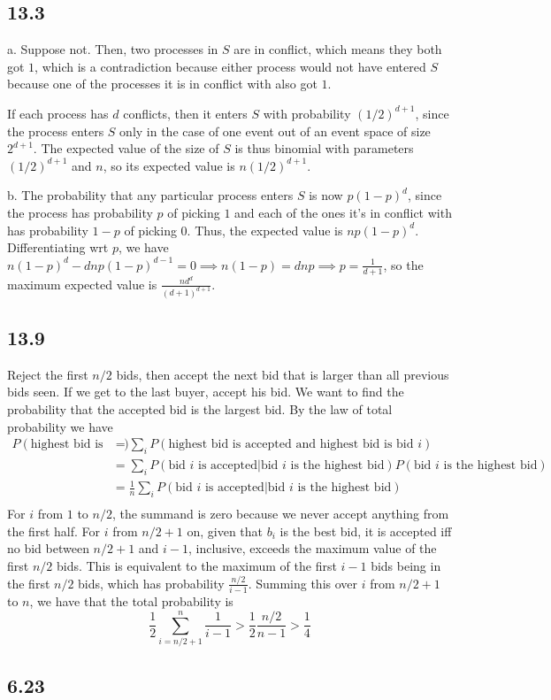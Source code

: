 \documentclass{article}
\begin{document}
\subsection*{13.3}
a. Suppose not. Then, two processes in $S$ are in conflict, which means they both got $1$, which is a contradiction because either process would not have entered $S$ because one of the processes it is in conflict with also got $1$. 

If each process has $d$ conflicts, then it enters $S$ with probability $(1/2)^{d+1}$, since the process enters $S$ only in the case of one event out of an event space of size $2^{d+1}$. The expected value of the size of $S$ is thus binomial with parameters $(1/2)^{d+1}$ and $n$, so its expected value is $n(1/2)^{d+1}$.

\noindent b. The probability that any particular process enters $S$ is now $p(1-p)^d$, since the process has probability $p$ of picking $1$ and each of the ones it's in conflict with has probability $1-p$ of picking $0$. Thus, the expected value is $np(1-p)^d$. Differentiating wrt $p$, we have $n(1-p)^d-dnp(1-p)^{d-1}=0\implies n(1-p)=dnp\implies p=\frac{1}{d+1}$, so the maximum expected value is $\frac{nd^d}{(d+1)^{d+1}}$.
\subsection*{13.9}
Reject the first $n/2$ bids, then accept the next bid that is larger than all previous bids seen. If we get to the last buyer, accept his bid. We want to find the probability that the accepted bid is the largest bid. By the law of total probability we have 
\begin{align*}
P(\text{highest bid is accepted})&=\sum_iP(\text{highest bid is accepted and highest bid is bid $i$})\\
&=\sum_iP(\text{bid $i$ is accepted}|\text{bid $i$ is the highest bid})P(\text{bid $i$ is the highest bid})\\
&=\frac{1}{n}\sum_iP(\text{bid $i$ is accepted}|\text{bid $i$ is the highest bid})\\
\end{align*}
For $i$ from $1$ to $n/2$, the summand is zero because we never accept anything from the first half. For $i$ from $n/2+1$ on, given that $b_i$ is the best bid, it is accepted iff no bid between $n/2+1$ and $i-1$, inclusive, exceeds the maximum value of the first $n/2$ bids. This is equivalent to the maximum of the first $i-1$ bids being in the first $n/2$ bids, which has probability $\frac{n/2}{i-1}$. Summing this over $i$ from $n/2+1$ to $n$, we have that the total probability is 
$$\frac{1}{2}\sum_{i=n/2+1}^n\frac{1}{i-1}>\frac{1}{2}\frac{n/2}{n-1}>\frac{1}{4}$$
\subsection*{6.23}
\end{document}
